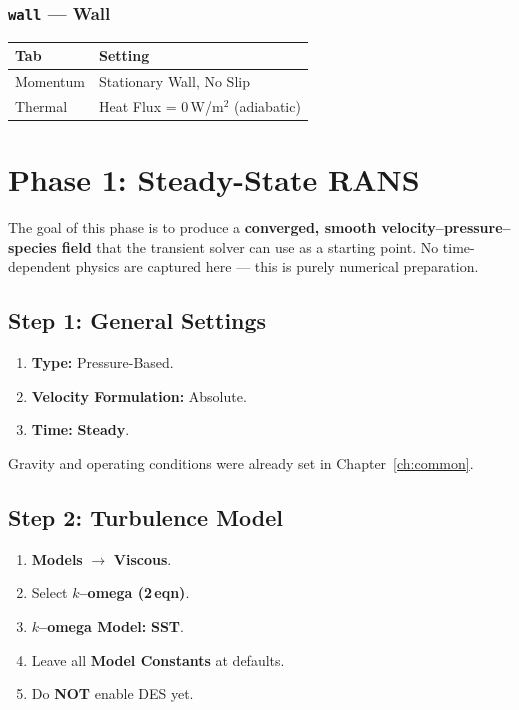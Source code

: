 \documentclass[12pt,a4paper]{report}
\begin{document}
\subsection{\texttt{wall} --- Wall}

\begin{tabular}{@{}ll@{}}
\toprule
\textbf{Tab} & \textbf{Setting} \\
\midrule
Momentum & Stationary Wall, No Slip \\
Thermal  & Heat Flux = 0\,W/m$^2$ (adiabatic) \\
\bottomrule
\end{tabular}


\chapter{Phase 1: Steady-State RANS}
\label{ch:phase1}

The goal of this phase is to produce a \textbf{converged, smooth
velocity--pressure--species field} that the transient solver can use
as a starting point.  No time-dependent physics are captured here ---
this is purely numerical preparation.


\section{Step 1: General Settings}

\begin{enumerate}
  \item \textbf{Type:} Pressure-Based.
  \item \textbf{Velocity Formulation:} Absolute.
  \item \textbf{Time:} \textbf{Steady}.
\end{enumerate}

\noindent Gravity and operating conditions were already set in
Chapter~\ref{ch:common}.


\section{Step 2: Turbulence Model}

\begin{enumerate}
  \item \textbf{Models} $\rightarrow$ \textbf{Viscous}.
  \item Select \textbf{$k$--omega (2\,eqn)}.
  \item \textbf{$k$--omega Model:} \textbf{SST}.
  \item Leave all \textbf{Model Constants} at defaults.
  \item Do \textbf{NOT} enable DES yet.
\end{enumerate}
\end{document}
